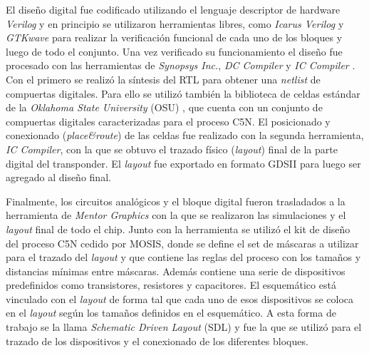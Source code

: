 El diseño digital fue codificado utilizando el lenguaje descriptor de 
hardware \emph{Verilog} \cite{Verilog} y en principio se utilizaron 
herramientas libres, como \emph{Icarus Verilog} \cite{IVerilog} y 
\emph{GTKwave} \cite{GTKWave} para realizar la verificación 
funcional de cada uno de los bloques y luego de todo el conjunto. Una 
vez verificado su funcionamiento el diseño fue procesado con las 
herramientas de \emph{Synopsys Inc.}, \emph{DC Compiler} 
\cite{SynopsysDC} y \emph{IC Compiler} \cite{SynopsysICCompiler}. Con 
el primero se realizó la síntesis del RTL para obtener una 
\emph{netlist} de compuertas digitales. Para ello se utilizó también la 
biblioteca de celdas estándar de la \emph{Oklahoma State University} 
(OSU) \cite{OSUstandardCells}, que cuenta con un conjunto de 
compuertas digitales caracterizadas para el proceso C5N. El 
posicionado y conexionado (\emph{place\&route}) de las celdas fue 
realizado con la segunda herramienta, \emph{IC Compiler}, con la que 
se obtuvo el trazado físico (\emph{layout}) final de la parte digital 
del transponder. El \emph{layout} fue exportado en formato GDSII para 
luego ser agregado al diseño final.

Finalmente, los circuitos analógicos y el bloque digital fueron 
trasladados a la herramienta de \emph{Mentor Graphics} 
\cite{MentorCustomIC} con la que se realizaron las simulaciones y el 
\emph{layout} final de todo el chip. Junto con la herramienta se 
utilizó el kit de diseño del proceso C5N cedido por MOSIS, donde 
se define el set de máscaras a utilizar para el trazado del 
\emph{layout} y que contiene las reglas del proceso con los tamaños y 
distancias mínimas entre máscaras. Además contiene una serie de 
dispositivos predefinidos como transistores, resistores y capacitores. 
El esquemático está vinculado con el \emph{layout} de forma tal que 
cada uno de esos dispositivos se coloca en el \emph{layout} según los 
tamaños definidos en el esquemático. A esta forma de trabajo se la 
llama \emph{Schematic Driven Layout} (SDL) y fue la que se utilizó 
para el trazado de los dispositivos y el conexionado de los diferentes 
bloques.
